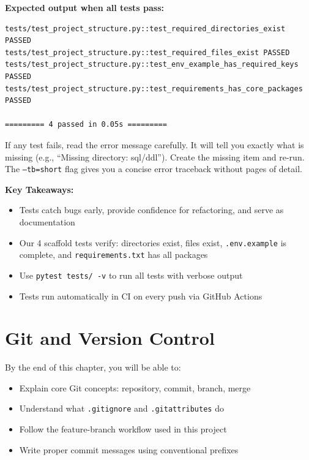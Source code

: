 \documentclass[12pt, a4paper, oneside]{report}
\begin{document}
\textbf{Expected output when all tests pass:}
\begin{lstlisting}[style=bashstyle]
tests/test_project_structure.py::test_required_directories_exist PASSED
tests/test_project_structure.py::test_required_files_exist PASSED
tests/test_project_structure.py::test_env_example_has_required_keys PASSED
tests/test_project_structure.py::test_requirements_has_core_packages PASSED

========= 4 passed in 0.05s =========
\end{lstlisting}

\begin{tipbox}
    If any test fails, read the error message carefully. It will tell you exactly what is missing (e.g., ``Missing directory: sql/ddl''). Create the missing item and re-run. The \texttt{--tb=short} flag gives you a concise error traceback without pages of detail.
\end{tipbox}

\begin{summarybox}
\textbf{Key Takeaways:}
\begin{itemize}
    \item Tests catch bugs early, provide confidence for refactoring, and serve as documentation
    \item Our 4 scaffold tests verify: directories exist, files exist, \texttt{.env.example} is complete, and \texttt{requirements.txt} has all packages
    \item Use \texttt{pytest tests/ -v} to run all tests with verbose output
    \item Tests run automatically in CI on every push via GitHub Actions
\end{itemize}
\end{summarybox}


\chapter{Git and Version Control}
\label{ch:git}

\begin{objectivebox}
By the end of this chapter, you will be able to:
\begin{itemize}
    \item Explain core Git concepts: repository, commit, branch, merge
    \item Understand what \texttt{.gitignore} and \texttt{.gitattributes} do
    \item Follow the feature-branch workflow used in this project
    \item Write proper commit messages using conventional prefixes
\end{itemize}
\end{objectivebox}
\end{document}
